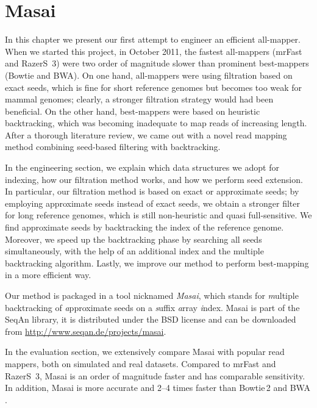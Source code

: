 
\chapter{Masai}

In this chapter we present our first attempt to engineer an efficient all-mapper.
When we started this project, in October 2011, the fastest all-mappers (mrFast and RazerS~3) were two order of magnitude slower than prominent best-mappers (Bowtie and BWA).
On one hand, all-mappers were using filtration based on exact seeds, which is fine for short reference genomes but becomes too weak for mammal genomes; clearly, a stronger filtration strategy would had been beneficial.
On the other hand, best-mappers were based on heuristic backtracking, which was becoming inadequate to map reads of increasing length.
After a thorough literature review, we came out with a novel read mapping method combining seed-based filtering with backtracking.

In the engineering section, we explain which data structures we adopt for indexing, how our filtration method works, and how we perform seed extension.
In particular, our filtration method is based on exact or approximate seeds; by employing approximate seeds instead of exact seeds, we obtain a stronger filter for long reference genomes, which is still non-heuristic and quasi full-sensitive.
We find approximate seeds by backtracking the index of the reference genome.
Moreover, we speed up the backtracking phase by searching all seeds simultaneously, with the help of an additional index and the multiple backtracking algorithm.
Lastly, we improve our method to perform best-mapping in a more efficient way.

Our method is packaged in a \CC tool nicknamed \emph{Masai}, which stands for \emph{m}ultiple backtracking of \emph{a}pproximate seeds on a \emph{s}uffix \emph{a}rray \emph{i}ndex.
Masai is part of the SeqAn library, it is distributed under the BSD license and can be downloaded from \url{http://www.seqan.de/projects/masai}.

In the evaluation section, we extensively compare Masai with popular read mappers, both on simulated and real datasets.
Compared to mrFast and RazerS~3, Masai is an order of magnitude faster and has comparable sensitivity.
In addition, Masai is more accurate and 2--4 times faster than Bowtie\,2 \citep{Bowtie2} and BWA \citep{BWA}.


